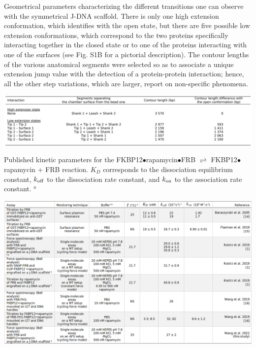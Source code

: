 \documentclass{biophys-new}
\begin{document}
\begin{table}[hbt!] %
	\caption{Geometrical parameters characterizing the different transitions one can observe with the symmetrical J-DNA scaffold. There is only one high extension conformation, which identifies with the open state, but there are five possible low extension conformations, which correspond to the two proteins specifically interacting together in the closed state or to one of the proteins interacting with one of the surfaces (see Fig. S1B for a pictorial description). The contour lengths of the various anatomical segments were selected so as to associate a unique extension jump value with the detection of a protein-protein interaction; hence, all the other step variations, which are larger, report on non-specific phenomena.}
	\label{tbl:s2}
	\includegraphics[width=\linewidth]{Figures/TableS2pdf.png}
\end{table}

\FloatBarrier
\newpage

\begin{table}[hbt!] %
	\caption{Published kinetic parameters for the FKBP12$\bullet$rapamycin$\bullet$FRB   $\rightleftharpoons$  FKBP12$\bullet$rapamycin + FRB reaction. $K_D$ corresponds to the dissociation equilibrium constant, $k_{\rm off}$ to the dissociation rate constant, and $k_{\rm on}$ to the association rate constant. $^a$}
	\label{tbl:s3}
	\includegraphics[width=\linewidth]{Figures/TableS3.png}
\end{table}
\end{document}
